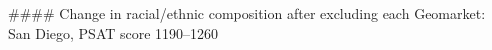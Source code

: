 #### Change in racial/ethnic composition after excluding each Geomarket: San Diego, PSAT score 1190–1260
